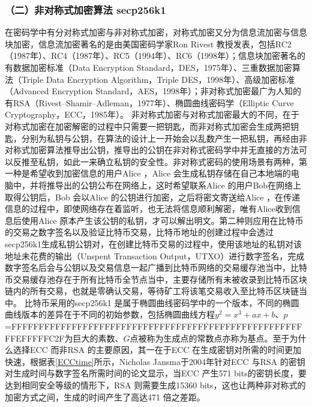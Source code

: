 				\subsubsection{（二）非对称式加密算法 secp256k1}
				在密码学中有分对称式加密与非对称式加密，对称式加密又分为信息流加密与信息块加密，信息流加密著名的是由美国密码学家Ron Rivest 教授发表，包括RC2（1987年）\supercite{OnthedesignandsecurityofRC2}、RC4（1987年）\supercite{Rc4}、RC5（1994年）\supercite{TheRC5encryptionalgorithm}、RC6（1998年）\supercite{TheRC6blockcipher.v1.1August201998}；信息块加密著名的有数据加密标准（Data Encryption Standard，DES，1975年）\supercite{Dataencryptionstandard}、三重数据加密算法（Triple Data Encryption Algorithm，Triple DES，1998年）\supercite{TrippleDataEncryptionAlgorithmModesofOperation}、高级加密标准（Advanced Encryption Standard，AES，1998年）\supercite{ThedesignofRijndael:AES-theadvancedencryptionstandard}；非对称式加密最广为人知的有RSA（Rivest–Shamir–Adleman，1977年）\supercite{Cryptographiccommunicationssystemandmethod}、椭圆曲线密码学（Elliptic Curve Cryptography，ECC，1985年）\supercite{Ellipticcurvecryptosystems}。
				非对称式加密与对称式加密最大的不同，在于对称式加密在加密解密的过程中只需要一把钥匙，而非对称式加密会生成两把钥匙，分别为私钥与公钥，在算法的设计上一开始会以乱数产生一把私钥，再经由非对称式加密算法推导出公钥，推导出的公钥在非对称式密码学中并无直接的方法可以反推至私钥，如此一来确立私钥的安全性。非对称式密码的使用场景有两种，第一种是希望收到加密信息的用户Alice ，Alice 会生成私钥存储在自己本地端的电脑中，并将推导出的公钥公布在网络上，这时希望联系Alice 的用户Bob在网络上取得公钥后，Bob 会以Alice 的公钥进行加密，之后将密文寄送给Alice ，在传递信息的过程中，即使网络存在着监听，也无法将信息顺利解密，唯有Alice收到信息后使用Alice 原本产生该公钥的私钥，才可以解出明文。第二种则应用在比特币的交易之数字签名以及验证比特币交易，比特币地址的创建过程中会透过secp256k1生成私钥公钥对，在创建比特币交易的过程中，使用该地址的私钥对该地址未花费的输出（Unspent Transaction Output，UTXO）\supercite{bitcoinpaper}进行数字签名，完成数字签名后会与公钥以及交易信息一起广播到比特币网络的交易缓存池当中，比特币交易缓存池存在于所有比特币全节点当中，主要存储所有未被收录到比特币区块链内的所有交易，也就是零确认交易，等待矿工将该笔交易收入至比特币区块链当中。
				比特币采用的secp256k1 是属于椭圆曲线密码学中的一个版本，不同的椭圆曲线版本的差异在于不同的初始参数，包括椭圆曲线方程$y^2=x^3+ax+b$、$p$=FFFFFFFFFFFFFFFFFFFFFFFFFFFFFFFFFFFFFFFFFFFFFFFFFFFFFFFEFFFFFC2F为巨大的素数、$G$点被称为⽣成点的常数点亦称为基点。至于为什么选择ECC 而非RSA 的主要原因，其一在于ECC 在生成密钥对所需的时间更加快速，根据表\ref{ECCtime}所示，Nicholas Jansma于2004年针对ECC 与RSA 的密钥对生成时间与数字签名所需时间的论文\supercite{Performancecomparisonofellipticcurveandrsadigitalsignatures}显示，当ECC 产生571 bits的密钥长度，要达到相同安全等级的情形下，RSA 则需要⽣成15360 bits，这也让两种非对称式的加密方式之间，⽣成的时间产生了⾼达471 倍之差距。

